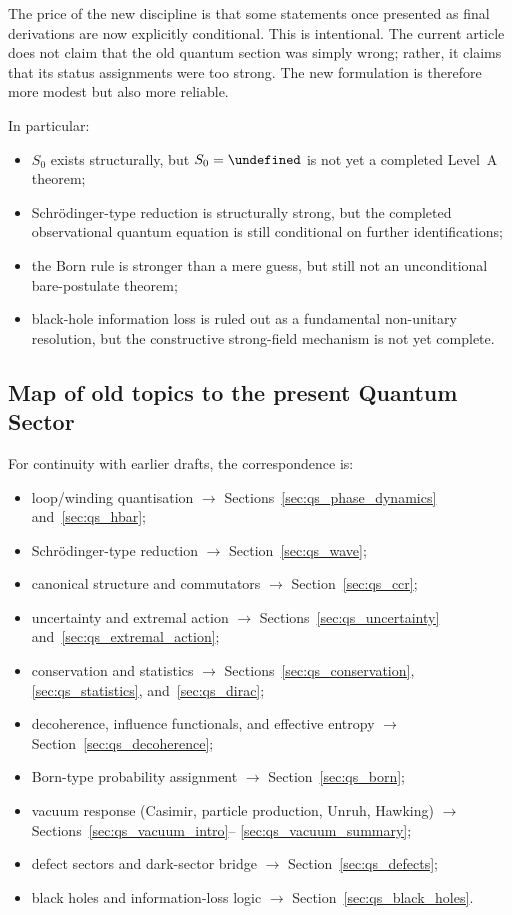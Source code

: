 \documentclass[11pt,a4paper]{article}
\let\hbar\undefined
\numberwithin{equation}{section}
\begin{document}
The price of the new discipline is that some statements once presented
as final derivations are now explicitly conditional.
This is intentional.
The current article does not claim that the old quantum section was
simply wrong; rather, it claims that its status assignments were too
strong.
The new formulation is therefore more modest but also more reliable.

In particular:
\begin{itemize}
  \item $S_0$ exists structurally, but $S_0=\hbar$ is not yet a
  completed Level~A theorem;
  \item Schr\"odinger-type reduction is structurally strong, but the
  completed observational quantum equation is still conditional on
  further identifications;
  \item the Born rule is stronger than a mere guess, but still not an
  unconditional bare-postulate theorem;
  \item black-hole information loss is ruled out as a fundamental
  non-unitary resolution, but the constructive strong-field mechanism is
  not yet complete.
\end{itemize}

\subsection*{Map of old topics to the present Quantum Sector}

For continuity with earlier drafts, the correspondence is:
\begin{itemize}
  \item loop/winding quantisation
    $\rightarrow$ Sections~\ref{sec:qs_phase_dynamics}
    and~\ref{sec:qs_hbar};
  \item Schr\"odinger-type reduction
    $\rightarrow$ Section~\ref{sec:qs_wave};
  \item canonical structure and commutators
    $\rightarrow$ Section~\ref{sec:qs_ccr};
  \item uncertainty and extremal action
    $\rightarrow$ Sections~\ref{sec:qs_uncertainty}
    and~\ref{sec:qs_extremal_action};
  \item conservation and statistics
    $\rightarrow$ Sections~\ref{sec:qs_conservation},
    \ref{sec:qs_statistics}, and~\ref{sec:qs_dirac};
  \item decoherence, influence functionals, and effective entropy
    $\rightarrow$ Section~\ref{sec:qs_decoherence};
  \item Born-type probability assignment
    $\rightarrow$ Section~\ref{sec:qs_born};
  \item vacuum response (Casimir, particle production, Unruh, Hawking)
    $\rightarrow$ Sections~\ref{sec:qs_vacuum_intro}--
    \ref{sec:qs_vacuum_summary};
  \item defect sectors and dark-sector bridge
    $\rightarrow$ Section~\ref{sec:qs_defects};
  \item black holes and information-loss logic
    $\rightarrow$ Section~\ref{sec:qs_black_holes}.
\end{itemize}
\end{document}
